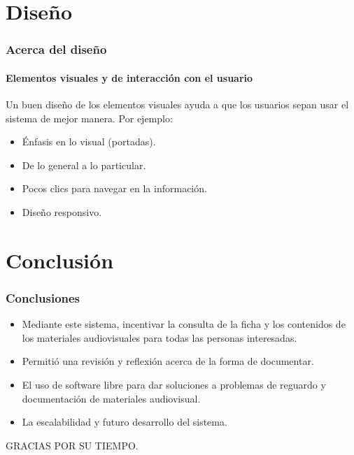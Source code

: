 \documentclass{beamer}
\begin{document}
\section{Diseño}
\begin{frame}
	\frametitle{Acerca del diseño}
	\framesubtitle{Elementos visuales y de interacción con el usuario}
	
	Un buen diseño de los elementos visuales ayuda a que los usuarios sepan usar el sistema de mejor manera. Por ejemplo:
	
	\begin{itemize}
		\item Énfasis en lo visual (portadas).
		\item De lo general a lo particular.
		\item Pocos clics para navegar en la información.
		\item Diseño responsivo.
	\end{itemize}
\end{frame}

\section{Conclusión}
\begin{frame}
	\frametitle{Conclusiones}
	\begin{itemize}
		\item Mediante este sistema, incentivar la consulta de la ficha y los contenidos de los materiales audiovisuales para todas las personas interesadas.
		\item Permitió una revisión y reflexión acerca de la forma de documentar.
		\item El uso de software libre para dar soluciones a problemas de reguardo y documentación de materiales audiovisual.
		\item La escalabilidad y futuro desarrollo del sistema.
	\end{itemize}
\end{frame}

\begin{frame}
	\begin{center}
		GRACIAS POR SU TIEMPO.
		
	\end{center}
\end{frame}
\end{document}
